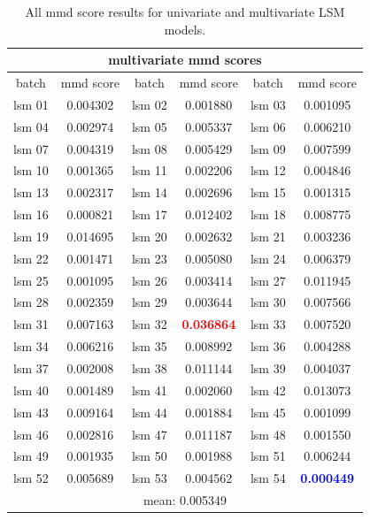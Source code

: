 \begin{table}[h!]
    \begin{tabular}{|c c |c c| c c|}
        \multicolumn{6}{c}{multivariate mmd scores}\\
        \hline
        batch & mmd score & batch & mmd score & batch & mmd score\\
        \hline\hline
        lsm 01 & 0.004302 &
        lsm 02 & 0.001880 &
        lsm 03 & 0.001095 \\
        lsm 04 & 0.002974 &
        lsm 05 & 0.005337 &
        lsm 06 & 0.006210 \\
        lsm 07 & 0.004319 &
        lsm 08 & 0.005429 &
        lsm 09 & 0.007599 \\
        lsm 10 & 0.001365 &
        lsm 11 & 0.002206 &
        lsm 12 & 0.004846 \\
        lsm 13 & 0.002317 &
        lsm 14 & 0.002696 &
        lsm 15 & 0.001315 \\
        lsm 16 & 0.000821 &
        lsm 17 & 0.012402 &
        lsm 18 & 0.008775 \\
        lsm 19 & 0.014695 &
        lsm 20 & 0.002632 &
        lsm 21 & 0.003236 \\
        lsm 22 & 0.001471 &
        lsm 23 & 0.005080 &
        lsm 24 & 0.006379 \\
        lsm 25 & 0.001095 &
        lsm 26 & 0.003414 &
        lsm 27 & 0.011945 \\
        lsm 28 & 0.002359 &
        lsm 29 & 0.003644 &
        lsm 30 & 0.007566 \\
        lsm 31 & 0.007163 &
        lsm 32 & \textbf{\textcolor{red}{0.036864}}&
        lsm 33 & 0.007520 \\
        lsm 34 & 0.006216 &
        lsm 35 & 0.008992 &
        lsm 36 & 0.004288 \\
        lsm 37 & 0.002008 &
        lsm 38 & 0.011144 &
        lsm 39 & 0.004037 \\
        lsm 40 & 0.001489 &
        lsm 41 & 0.002060 &
        lsm 42 & 0.013073 \\
        lsm 43 & 0.009164 &
        lsm 44 & 0.001884 &
        lsm 45 & 0.001099 \\
        lsm 46 & 0.002816 &
        lsm 47 & 0.011187 &
        lsm 48 & 0.001550 \\
        lsm 49 & 0.001935 &
        lsm 50 & 0.001988 &
        lsm 51 & 0.006244 \\
        lsm 52 & 0.005689 &
        lsm 53 & 0.004562 &
        lsm 54 & \textbf{\textcolor{blue}{0.000449}}\\
        \hline
        \multicolumn{6}{c}{mean: 0.005349}
    \end{tabular}
    \caption{All mmd score results for univariate and multivariate LSM models.}
    \label{table:lsm results}
\end{table}
